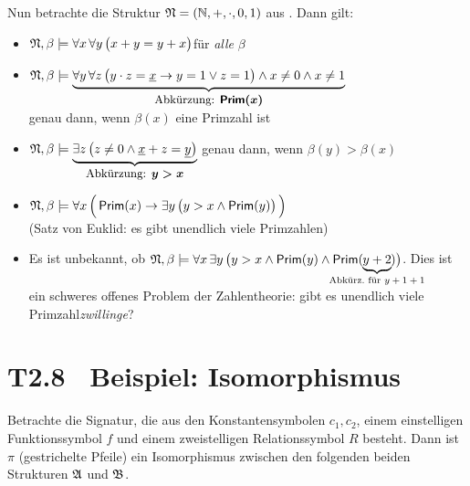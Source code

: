 \documentclass[fontsize=11pt, twoside=false, numbers=autoenddot]{scrbook}
\begin{document}
\par\bigskip
Nun betrachte die Struktur $\mathfrak{N} = (\mathbb{N},+,\cdot,0,1)$ aus . Dann gilt:
\par\smallskip
\begin{itemize}
  \item
    $\mathfrak{N},\beta \models \forall x\,\forall y\,\big(x+y=y+x\big)$\quad für \emph{alle} $\beta$
    \par\smallskip
  \item
    $\mathfrak{N},\beta \models \underbrace{\forall y\,\forall z\,\big(y \cdot z = \underline{x} \to y = 1 \lor z = 1\big) \land x \neq 0 \land x \neq 1}_{\text{{\small Abkürzung: {\boldmath $\textbf{\textsf{Prim}}(x)$}}}}$\\
    genau dann, wenn $\beta(x)$ eine Primzahl ist
    \par\smallskip
  \item
    $\mathfrak{N},\beta \models \underbrace{\exists z\,\big(z \neq 0 \land \underline{x} + z = \underline{y}\big)}_{\text{{\small Abkürzung: {\boldmath $y > x$}}}}$\quad
    genau dann, wenn $\beta(y) > \beta (x)$
    \par\smallskip
  \item
    $\mathfrak{N},\beta \models \forall x\,\Big(\,
      \textsf{Prim}(x) \to \exists y\,\big(
        y > x \land \textsf{Prim}(y)
      \big)
    \,\Big)$\\
    (Satz von Euklid: es gibt unendlich viele Primzahlen)
    \par\smallskip
  \item
    Es ist unbekannt, ob
    $\Nmf,\beta \models \forall x\,\exists y\,\big(
      y > x \land \textsf{Prim}(y) \land \textsf{Prim}(\hspace*{-9.4mm}\underbrace{y+2}_{\text{Abkürz.\ für $y+1+1$}}\hspace*{-9.4mm})
    \big)$.
    Dies ist ein schweres offenes Problem der Zahlentheorie: gibt es unendlich viele Primzahl\emph{zwillinge}?
    
\end{itemize}

\section*{T2.8~ Beispiel: Isomorphismus}

Betrachte die Signatur, die aus den Konstantensymbolen $c_1,c_2$,
einem einstelligen Funktionssymbol $f$ und einem zweistelligen Relationssymbol $R$ besteht.
Dann ist $\pi$ (gestrichelte Pfeile) ein Isomorphismus zwischen den folgenden
beiden Strukturen $\mathfrak{A}$ und $\mathfrak{B}$.
\end{document}
